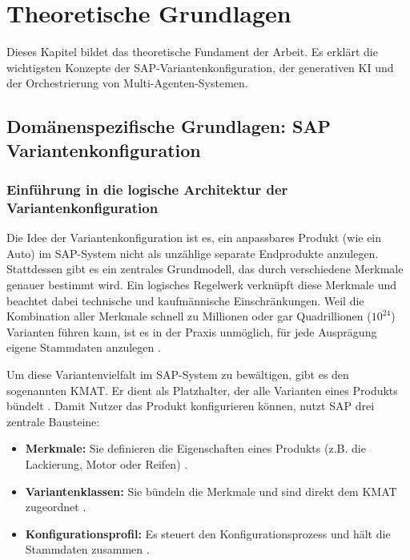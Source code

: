 \chapter{Theoretische Grundlagen}
\label{ch:theory}
Dieses Kapitel bildet das theoretische Fundament der Arbeit. Es erklärt die wichtigsten Konzepte der SAP-Variantenkonfiguration, der generativen \ac{KI} und der Orchestrierung von Multi-Agenten-Systemen.

\section{Domänenspezifische Grundlagen: SAP Variantenkonfiguration}
\subsection{Einführung in die logische Architektur der Variantenkonfiguration}

Die Idee der Variantenkonfiguration ist es, ein anpassbares Produkt (wie ein Auto) im SAP-System nicht als unzählige separate Endprodukte anzulegen. Stattdessen gibt es ein zentrales Grundmodell, das durch verschiedene Merkmale genauer bestimmt wird. Ein logisches Regelwerk verknüpft diese Merkmale und beachtet dabei technische und kaufmännische Einschränkungen. Weil die Kombination aller Merkmale schnell zu Millionen oder gar Quadrillionen ($10^{24}$) Varianten führen kann, ist es in der Praxis unmöglich, für jede Ausprägung eigene Stammdaten anzulegen \parencite[S. 86]{blumohrAdvancedVariantConfiguration2023}.

Um diese Variantenvielfalt im SAP-System zu bewältigen, gibt es den sogenannten \ac{KMAT}. Er dient als Platzhalter, der alle Varianten eines Produkts bündelt \parencite[S. 90]{blumohrAdvancedVariantConfiguration2023}. Damit Nutzer das Produkt konfigurieren können, nutzt SAP drei zentrale Bausteine:

\begin{itemize}
\item \textbf{Merkmale:} Sie definieren die Eigenschaften eines Produkts (z.B. die Lackierung, Motor oder Reifen) \parencite[S. 90 - 96]{blumohrAdvancedVariantConfiguration2023}.
\item \textbf{Variantenklassen:} Sie bündeln die Merkmale und sind direkt dem \ac{KMAT} zugeordnet \parencite[S. 90 - 96]{blumohrAdvancedVariantConfiguration2023}.
\item \textbf{Konfigurationsprofil:} Es steuert den Konfigurationsprozess und hält die Stammdaten zusammen \parencite[S. 90 - 96]{blumohrAdvancedVariantConfiguration2023}.
\end{itemize}

